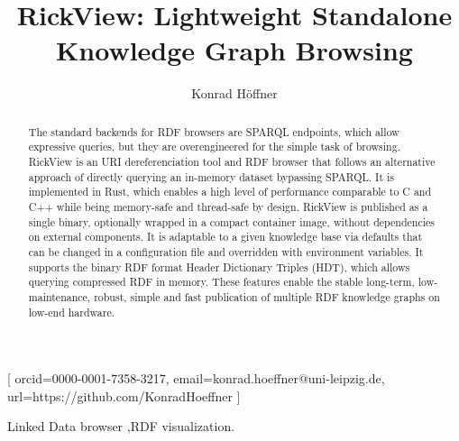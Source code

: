 \documentclass{ceurart}
\begin{document}
\title{RickView: Lightweight Standalone Knowledge Graph Browsing}
\author[1]{Konrad Höffner}[%
orcid=0000-0001-7358-3217,
email=konrad.hoeffner@uni-leipzig.de,
url=https://github.com/KonradHoeffner
]
\cormark[1]
\fnmark[1]
\address[1]{Institute for Medical Informatics, Statistics and Epidemiology (IMISE), Leipzig University, Leipzig, Germany}


%
\begin{abstract}
The standard backends for RDF browsers are SPARQL endpoints, which allow expressive queries, but they are overengineered for the simple task of browsing.
RickView is an URI dereferenciation tool and RDF browser that follows an alternative approach of directly querying an in-memory dataset bypassing SPARQL.
It is implemented in Rust, which enables a high level of performance comparable to C and C++ while being memory-safe and thread-safe by design.
RickView is published as a single binary, optionally wrapped in a compact container image, without dependencies on external components.
It is adaptable to a given knowledge base via defaults that can be changed in a configuration file and overridden with environment variables.
It supports the binary RDF format Header Dictionary Triples (HDT), which allows querying compressed RDF in memory.
These features enable the stable long-term, low-maintenance, robust, simple and fast publication of multiple RDF knowledge graphs on low-end hardware.
\end{abstract}
\begin{keywords}Linked Data browser \sep RDF visualization.\end{keywords}

\maketitle
\end{document}
